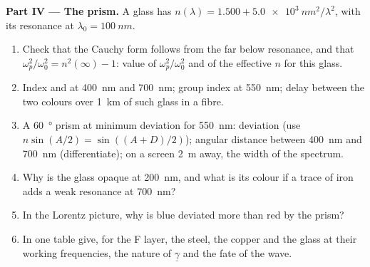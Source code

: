 \begin{problem}
\medskip
\noindent\textbf{Part IV --- The prism.}
A glass has $n(\lambda) = 1.500 + \qty{5.0e3}{nm^2}/\lambda^2$, with its resonance
at $\lambda_0 = \qty{100}{nm}$.
\begin{enumerate}[resume]
  \item Check that the Cauchy form follows from the  far
        below resonance, and that $\omega_p^2/\omega_0^2 = n^2(\infty) - 1$: value
        of $\omega_p^2/\omega_0^2$ and of the effective $n$ for this glass.
  \item Index and  at \qty{400}{nm} and \qty{700}{nm}; group
        index at \qty{550}{nm}; delay between the two colours over
        \qty{1}{km} of such glass in a fibre.
  \item A \qty{60}{\degree} prism at minimum deviation for \qty{550}{nm}:
        deviation (use $n\sin(A/2) = \sin((A + D)/2)$); angular distance
        between \qty{400}{nm} and \qty{700}{nm} (differentiate); on a screen
        \qty{2}{m} away, the width of the spectrum.
  \item Why is the glass opaque at \qty{200}{nm}, and what is its
        colour if a trace of iron adds a weak resonance at \qty{700}{nm}?
  \item In the Lorentz picture, why is blue deviated more than red by
        the prism?
  \item In one table give, for the F layer, the steel, the copper and
        the glass at their working frequencies, the nature of
        $\underline\gamma$ and the fate of the wave.
\end{enumerate}
\end{problem}
